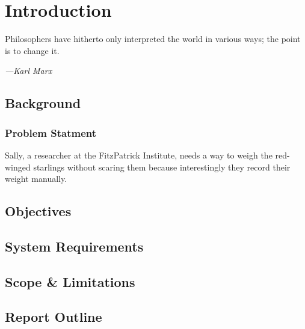\documentclass[class=report,11pt,crop=false]{standalone}
\begin{document}
\chapter{Introduction}
\epigraph{Philosophers have hitherto only interpreted the world in various ways; the point is to change it.}%
    {\emph{---Karl Marx}}
\vspace{0.5cm}


\section{Background}
\subsection{Problem Statment}
Sally, a researcher at the FitzPatrick Institute, needs a way to weigh the red-winged starlings without scaring them because interestingly they record their weight manually.

\section{Objectives}


\section{System Requirements}


\section{Scope \& Limitations}


\section{Report Outline}


\ifstandalone

\printnoidxglossary[type=\acronymtype,nonumberlist]
\fi
\end{document}
